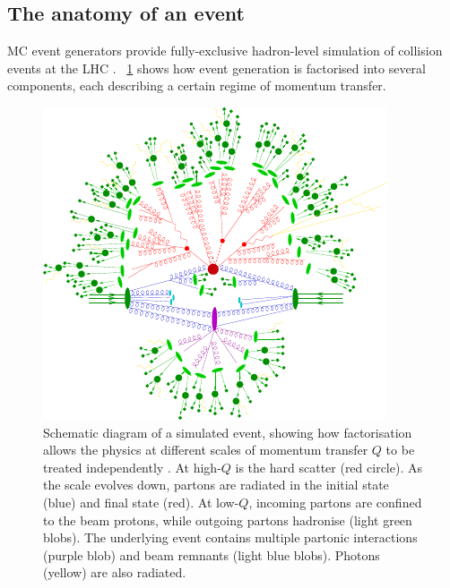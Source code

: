 
\subsection{The anatomy of an event}

\ac{MC} event generators provide fully-exclusive hadron-level simulation of \pp collision 
events at the \acs{LHC} \cite{MCnet:general}. \Figure~\ref{fig:mcevent} shows how event 
generation is factorised into several components, each describing a certain regime of 
momentum transfer.

\begin{figure}[b]
	\includegraphics[width=\mediumfigwidth]{tex/tools/event}
	\caption{Schematic diagram of a simulated \ttH event, showing how factorisation allows 
	the physics at different scales of momentum transfer $Q$ to be treated independently 
	\cite{MCnet:MatchingLectures}.
	At high-$Q$ is the hard scatter (red circle). As the scale evolves down, partons are 
	radiated in the initial state (blue) and final state (red). At low-$Q$, incoming 
	partons are confined to the beam protons, while outgoing partons hadronise (light 
	green blobs). The underlying event contains multiple partonic interactions (purple 
	blob) and beam remnants (light blue blobs). Photons (yellow) are also radiated.}
	\label{fig:mcevent}
\end{figure}

